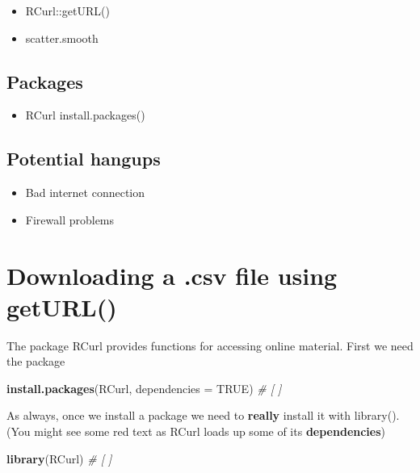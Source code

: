 \documentclass[]{book}
\newenvironment{Shaded}{\begin{snugshade}}{\end{snugshade}}
\newcommand{\KeywordTok}[1]{\textcolor[rgb]{0.13,0.29,0.53}{\textbf{#1}}}
\newcommand{\DataTypeTok}[1]{\textcolor[rgb]{0.13,0.29,0.53}{#1}}
\newcommand{\CommentTok}[1]{\textcolor[rgb]{0.56,0.35,0.01}{\textit{#1}}}
\newcommand{\OtherTok}[1]{\textcolor[rgb]{0.56,0.35,0.01}{#1}}
\newcommand{\NormalTok}[1]{#1}
\providecommand{\tightlist}{%
  \setlength{\itemsep}{0pt}\setlength{\parskip}{0pt}}
\theoremstyle{definition}
\theoremstyle{definition}
\theoremstyle{definition}
\theoremstyle{remark}
\begin{document}
\begin{itemize}
\tightlist
\item
  RCurl::getURL()
\item
  scatter.smooth
\end{itemize}

\subsection{Packages}\label{packages-3}

\begin{itemize}
\tightlist
\item
  RCurl install.packages()
\end{itemize}

\subsection{Potential hangups}\label{potential-hangups-2}

\begin{itemize}
\tightlist
\item
  Bad internet connection
\item
  Firewall problems
\end{itemize}

\section{\texorpdfstring{\protect\hyperlink{section-3}{} Downloading a
.csv file using
getURL()}{ Downloading a .csv file using getURL()}}\label{downloading-a-.csv-file-using-geturl}

The package RCurl provides functions for accessing online material.
First we need the package

\begin{Shaded}
\begin{Highlighting}[]
\KeywordTok{install.packages}\NormalTok{(RCurl, }\DataTypeTok{dependencies =} \OtherTok{TRUE}\NormalTok{) }\CommentTok{# [ ]}
\end{Highlighting}
\end{Shaded}

As always, once we install a package we need to \textbf{really} install
it with library(). (You might see some red text as RCurl loads up some
of its \textbf{dependencies})

\begin{Shaded}
\begin{Highlighting}[]
\KeywordTok{library}\NormalTok{(RCurl) }\CommentTok{# [ ]}
\end{Highlighting}
\end{Shaded}
\end{document}
